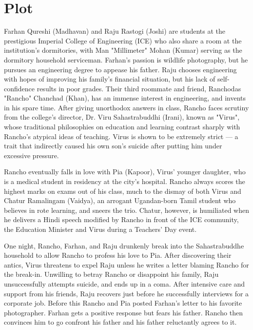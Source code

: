 \documentclass{article}
\begin{document}
\section{Plot}
Farhan Qureshi (Madhavan) and Raju Rastogi (Joshi) are students at the prestigious Imperial College of Engineering (ICE) who also share a room at the institution's dormitories, with Man "Millimeter" Mohan (Kumar) serving as the dormitory household serviceman. Farhan's passion is wildlife photography, but he pursues an engineering degree to appease his father. Raju chooses engineering with hopes of improving his family's financial situation, but his lack of self-confidence results in poor grades. Their third roommate and friend, Ranchodas "Rancho" Chanchad (Khan), has an immense interest in engineering, and invents in his spare time. After giving unorthodox answers in class, Rancho faces scrutiny from the college's director, Dr. Viru Sahastrabuddhi (Irani), known as "Virus", whose traditional philosophies on education and learning contrast sharply with Rancho's atypical ideas of teaching. Virus is shown to be extremely strict — a trait that indirectly caused his own son's suicide after putting him under excessive pressure.

Rancho eventually falls in love with Pia (Kapoor), Virus' younger daughter, who is a medical student in residency at the city's hospital. Rancho always scores the highest marks on exams out of his class, much to the dismay of both Virus and Chatur Ramalingam (Vaidya), an arrogant Ugandan-born Tamil student who believes in rote learning, and sneers the trio. Chatur, however, is humiliated when he delivers a Hindi speech modified by Rancho in front of the ICE community, the Education Minister and Virus during a Teachers' Day event.

One night, Rancho, Farhan, and Raju drunkenly break into the Sahastrabuddhe household to allow Rancho to profess his love to Pia. After discovering their antics, Virus threatens to expel Raju unless he writes a letter blaming Rancho for the break-in. Unwilling to betray Rancho or disappoint his family, Raju unsuccessfully attempts suicide, and ends up in a coma. After intensive care and support from his friends, Raju recovers just before he successfully interviews for a corporate job. Before this Rancho and Pia posted Farhan's letter to his favorite photographer. Farhan gets a positive response but fears his father. Rancho then convinces him to go confront his father and his father reluctantly agrees to it.
\end{document}
